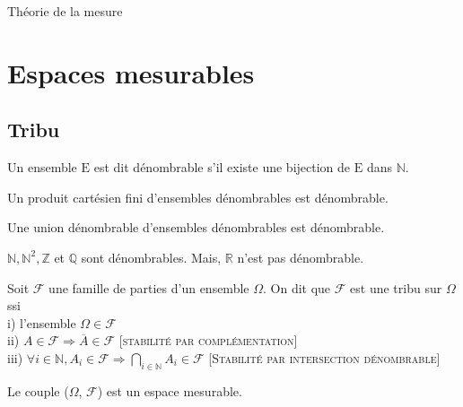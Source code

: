 \documentclass[landscape,twocolumn]{article}
\begin{document}
\begin{center}
{\Huge Théorie de la mesure}
\end{center}

\section{Espaces mesurables}

\subsection{Tribu}

\begin{rappel}
Un ensemble $\mathrm{E}$ est dit dénombrable s'il existe une bijection de $\mathrm{E}$ dans $\mathbb{N}$.
\end{rappel}

\begin{rappel}
Un produit cartésien fini d'ensembles dénombrables est dénombrable.
\end{rappel}

\begin{rappel}
Une union dénombrable d'ensembles dénombrables est dénombrable.
\end{rappel}

\begin{exe}
$\mathbb{N}, \mathbb{N}^2, \mathbb{Z}$ et $\mathbb{Q}$ sont dénombrables.
Mais, $\mathbb{R}$ n'est pas dénombrable.
\end{exe}

\begin{defin}[Tribu]
Soit $\mathcal{F}$ une famille de parties d'un ensemble $\Omega$. On dit que $\mathcal{F}$ est une tribu sur $\Omega$ ssi \\
i) l'ensemble $\Omega \in \mathcal{F}$ \\
ii) $A \in \mathcal{F} \Longrightarrow \overline{A} \in \mathcal{F}$ {\small [\textsc{stabilité par complémentation}]} \\
iii) $\forall i \in \mathbb{N}, A_i \in \mathcal{F} \Longrightarrow \bigcap \limits_{i \in \mathbb{N}} A_i \in \mathcal{F}$ {\small [\textsc{Stabilité par intersection dénombrable}]}
\end{defin}

 \begin{defin}
 Le couple ($\Omega$, $\mathcal{F}$) est un espace mesurable.
 \end{defin}
\end{document}
